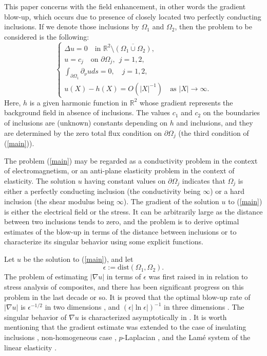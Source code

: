 \documentclass[11pt,a4paper]{article}
\numberwithin{equation}{section}
\newcommand{\ds}{\displaystyle}
\newcommand{\p}{\partial}
\newcommand{\eqnref}[1]{(\ref {#1})}
\newcommand{\Rbb}{\mathbb{R}}
\newcommand{\Ge}{\epsilon}
\newcommand{\GD}{\Delta}
\newcommand{\GO}{\Omega}
\newcommand{\beq}{\begin{equation}}
\newcommand{\eeq}{\end{equation}}
\begin{document}
This paper concerns with the field enhancement, in other words the gradient blow-up, which occurs due to presence of closely located two perfectly conducting inclusions. If we denote those inclusions by $\GO_1$ and $\GO_2$, then the problem to be considered is the following:
\beq\label{main}
\begin{cases}
\GD u = 0 \quad\mbox{in } \Rbb^2 \setminus \overline {(\GO_{1} \cup \GO_{2})}, \\
\ds u = {c}_j  \quad\mbox{on }\p \GO_{j}, \ \ j=1,2,  \\
\ds \int_{\p \GO_{1}} \p_{\nu} u ds =0, \quad j=1,2,\\
\ds u (X) - h(X) = O(|X|^{-1}) \quad\mbox{as } |X| \rightarrow \infty.
\end{cases}
\eeq
Here, $h$ is a given harmonic function in $\Rbb^2$ whose gradient represents the background field in absence of inclusions. The values $c_1$ and $c_2$ on the boundaries of inclusions are (unknown) constants depending on $h$ and inclusions, and they are determined by the zero total flux condition on $\p\GO_j$ (the third condition of \eqnref{main}).

The problem \eqnref{main} may be regarded as a conductivity problem in the context of electromagnetism, or an anti-plane elasticity problem in the context of elasticity. The solution $u$ having constant values on $\p\GO_j$ indicates that $\GO_j$ is either a perfectly conducting inclusion (the conductivity being $\infty$) or a hard inclusion (the shear modulus being $\infty$). The gradient of the solution $u$ to \eqnref{main} is either the electrical field or the stress. It can be arbitrarily large as the distance between two inclusions tends to zero, and the problem is to derive optimal estimates of the blow-up in terms of the distance between inclusions or to characterize its singular behavior using some explicit functions.

Let $u$ be the solution to \eqnref{main}, and let
\beq
\Ge:= \mbox{dist} (\GO_1, \GO_2).
\eeq
The problem of estimating $|\nabla u|$ in terms of $\Ge$ was first raised in \cite{bab} in relation to stress analysis of composites, and there has been significant progress on this problem in the last decade or so. It is proved that the optimal blow-up rate of $|\nabla u|$ is $\Ge^{-1/2}$ in two dimensions \cite{AKL-MA-05, Y}, and $(\Ge|\ln\Ge|)^{-1}$ in three dimensions \cite{BLY-ARMA-09}. The singular behavior of $\nabla u$ is characterized asymptotically in \cite{ACKLY-ARMA-13, KLY-MA-15, KLY-JMPA-13, KLY-SIAP-14}.
It is worth mentioning that the gradient estimate was extended to the case of insulating inclusions \cite{AKL-MA-05, BLY-CPDE-10, Yun-JDE-16}, non-homogeneous case \cite{DL-arXiv}, $p$-Laplacian \cite{GN-MMS-12}, and the Lam\'e system of the linear elasticity \cite{BLL-ARMA-15, KY-arXiv}.
\end{document}
